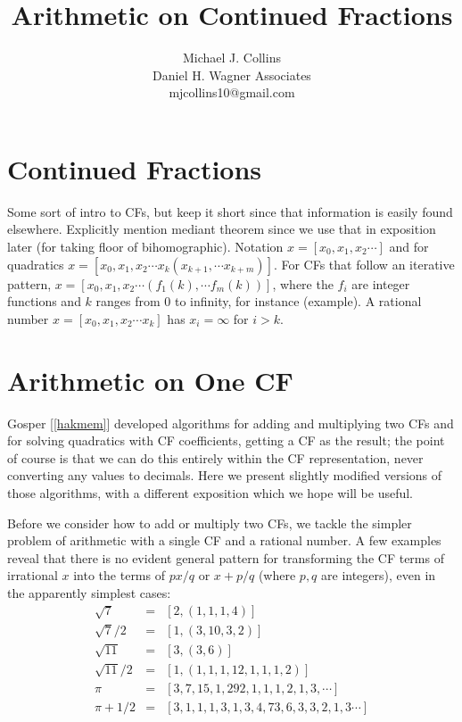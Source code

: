 \documentclass[11pt, oneside]{amsart}   	%
\title{Arithmetic on Continued Fractions}
\author{Michael J. Collins\\Daniel H. Wagner Associates\\mjcollins10@gmail.com}
\begin{document}
\maketitle

\section{Continued Fractions}
Some sort of intro to CFs, but keep it short since that information is easily found elsewhere. Explicitly mention mediant theorem since we use that in exposition later (for taking floor of bihomographic). Notation $x=[x_0,x_1,x_2 \cdots]$ and for quadratics $x=[x_0,x_1,x_2 \cdots x_k (x_{k+1},\cdots x_{k+m})]$. For CFs that follow an iterative pattern, $x=[x_0,x_1,x_2 \cdots (f_1(k),\cdots f_m(k))]$, where the $f_i$ are integer functions and $k$ ranges from $0$ to infinity, for instance (example). A rational number $x=[x_0,x_1,x_2 \cdots x_k]$ has $x_i = \infty$ for $i>k$.

\section{Arithmetic on One CF}
Gosper [\ref{hakmem}] developed algorithms for adding and multiplying two CFs and for solving quadratics with CF coefficients, getting a CF as the result; the point of course is that we can do this entirely within the CF representation, never converting any values to decimals. Here we present slightly modified versions of those algorithms, with a different exposition which we hope will be useful.

Before we consider how to add or multiply two CFs, we tackle the simpler problem of arithmetic with a single CF and a rational number. A few examples reveal that there is no evident general pattern for transforming the CF terms of irrational $x$ into the terms of $px/q$ or $x + p/q$ (where $p,q$ are integers), even in the apparently simplest cases:
\begin{eqnarray*}
\sqrt{7} & = & [2, (1, 1, 1, 4)] \\
\sqrt{7}/2 & = & [1, (3, 10, 3, 2)] \\
\sqrt{11} & = & [3, (3, 6)] \\
\sqrt{11}/2 & = & [1, (1, 1, 1, 12, 1, 1, 1, 2)] \\
\pi & = & [3,7,15,1,292,1,1,1, 2, 1, 3,\cdots]\\
\pi + 1/2 & = & [3, 1, 1, 1, 3, 1, 3, 4, 73, 6, 3, 3, 2, 1, 3\cdots]
\end{eqnarray*}
\end{document}
